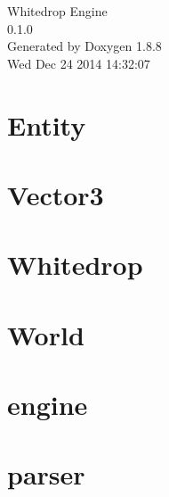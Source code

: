 \documentclass[twoside]{book}
\newcommand{\+}{\discretionary{\mbox{\scriptsize$\hookleftarrow$}}{}{}}
\newcommand{\clearemptydoublepage}{%
  \newpage{\pagestyle{empty}\cleardoublepage}%
}
\begin{document}
\hypersetup{pageanchor=false,
             bookmarks=true,
             bookmarksnumbered=true,
             pdfencoding=unicode
            }
\begin{titlepage}
\vspace*{7cm}
\begin{center}%
{\Large Whitedrop Engine \\[1ex]\large 0.\+1.\+0 }\\
\vspace*{1cm}
{\large Generated by Doxygen 1.8.8}\\
\vspace*{0.5cm}
{\small Wed Dec 24 2014 14:32:07}\\
\end{center}
\end{titlepage}
\clearemptydoublepage
\tableofcontents
\clearemptydoublepage
{}
\hypersetup{pageanchor=true}

\chapter{Entity}
\label{_entity_page}
\hypertarget{_entity_page}{}

\chapter{Vector3}
\label{_vector3_page}
\hypertarget{_vector3_page}{}

\chapter{Whitedrop}
\label{_whitedrop_page}
\hypertarget{_whitedrop_page}{}

\chapter{World}
\label{_world_page}
\hypertarget{_world_page}{}

\chapter{engine}
\label{md__c_1__ogre_s_d_k__projects_whitedrop_engine__r_e_a_d_m_e}
\hypertarget{md__c_1__ogre_s_d_k__projects_whitedrop_engine__r_e_a_d_m_e}{}

\chapter{parser}
\label{md__c_1__ogre_s_d_k__projects_whitedrop_parser_include__r_e_a_d_m_e}
\hypertarget{md__c_1__ogre_s_d_k__projects_whitedrop_parser_include__r_e_a_d_m_e}{}

\end{document}
